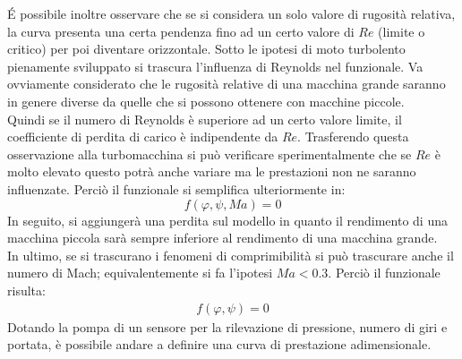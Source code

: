 \'E possibile inoltre osservare che se si considera un solo valore di rugosità relativa, la curva presenta una certa pendenza fino ad un certo valore di $Re$ (limite o critico) per poi diventare orizzontale. Sotto le ipotesi di moto turbolento pienamente sviluppato si trascura l’influenza di Reynolds nel funzionale. Va ovviamente considerato che le rugosità relative di una macchina grande saranno in genere diverse da quelle che si possono ottenere con macchine piccole.\\
Quindi se il numero di Reynolds è superiore ad un certo valore limite, il coefficiente di perdita di carico è indipendente da $Re$. Trasferendo questa osservazione alla turbomacchina si può verificare sperimentalmente che se $Re$ è molto elevato questo potrà anche variare ma le prestazioni non ne saranno influenzate. Perciò il funzionale si semplifica ulteriormente in:
\begin{equation}
f(\varphi,\psi,Ma)=0
\end{equation}
In seguito, si aggiungerà una perdita sul modello in quanto il rendimento di una macchina piccola sarà sempre inferiore al rendimento di una macchina grande.\\
In ultimo, se si trascurano i fenomeni di comprimibilità si può trascurare anche il numero di Mach; equivalentemente si fa l'ipotesi $Ma<0.3$. Perciò il funzionale risulta:
\begin{align*}
f(\varphi,\psi)=0
\end{align*}
Dotando la pompa di un sensore per la rilevazione di pressione, numero di giri e portata, è possibile andare a definire una curva di prestazione adimensionale.

